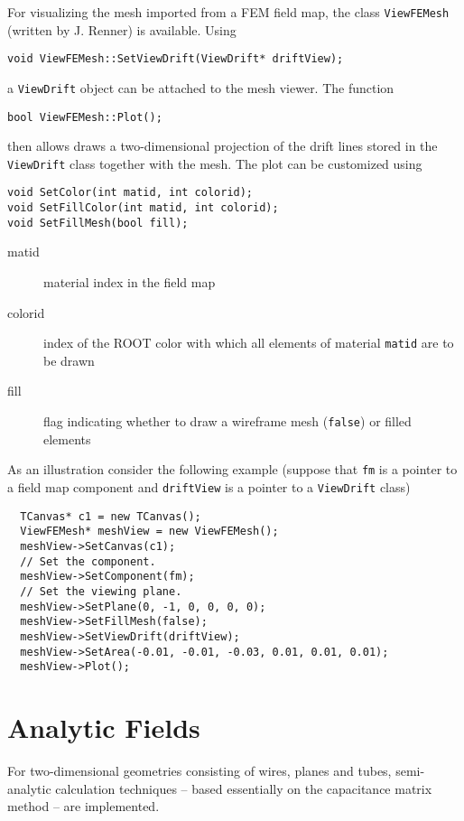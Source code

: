 For visualizing the mesh imported from a FEM field map, the class 
\texttt{ViewFEMesh} (written by J. Renner) is available. 
Using 
\begin{lstlisting}
void ViewFEMesh::SetViewDrift(ViewDrift* driftView);
\end{lstlisting}
a \texttt{ViewDrift} object can be attached to the mesh viewer. 
The function
\begin{lstlisting}
bool ViewFEMesh::Plot();
\end{lstlisting}
then allows draws a two-dimensional projection of the drift lines stored in the  
\texttt{ViewDrift} class together with the mesh. 
The plot can be customized using 
\begin{lstlisting}
void SetColor(int matid, int colorid);
void SetFillColor(int matid, int colorid);
void SetFillMesh(bool fill);
\end{lstlisting}
\begin{description}
  \item[matid] material index in the field map
  \item[colorid] index of the ROOT color with which all elements of material 
                 \texttt{matid} are to be drawn 
  \item[fill] flag indicating whether to draw a wireframe mesh (\texttt{false}) 
              or filled elements
\end{description}
As an illustration consider the following example 
(suppose that \texttt{fm} is a pointer to a field map component 
and \texttt{driftView} is a pointer to a \texttt{ViewDrift} class) 
\begin{lstlisting}
  TCanvas* c1 = new TCanvas();
  ViewFEMesh* meshView = new ViewFEMesh();
  meshView->SetCanvas(c1);
  // Set the component.
  meshView->SetComponent(fm);
  // Set the viewing plane.
  meshView->SetPlane(0, -1, 0, 0, 0, 0);
  meshView->SetFillMesh(false);
  meshView->SetViewDrift(driftView);
  meshView->SetArea(-0.01, -0.01, -0.03, 0.01, 0.01, 0.01);
  meshView->Plot();
\end{lstlisting}

\section{Analytic Fields}

For two-dimensional geometries consisting of wires, planes and tubes, 
semi-analytic calculation techniques -- based essentially 
on the capacitance matrix method -- are implemented.

